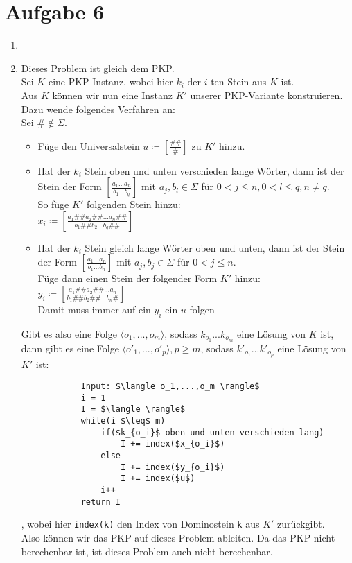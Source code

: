 \documentclass[a4paper,11pt]{scrartcl}
\begin{document}
\newpage
	\section*{Aufgabe 6}
	\begin{enumerate}[label=\alph*)]
	\item	
			
	\item	Dieses Problem ist gleich dem PKP.\\
			Sei $K$ eine PKP-Instanz, wobei hier $k_i$ der $i$-ten Stein aus $K$ ist.\\
			Aus $K$ können wir nun eine Instanz $K'$ unserer PKP-Variante konstruieren. Dazu wende folgendes Verfahren an:\\
			Sei $\# \not\in \Sigma$.
			\begin{itemize}
			\item Füge den Universalstein $u \coloneqq \left[ \frac{\#\#}{\#} \right]$ zu $K'$ hinzu.
			\item Hat der $k_i$ Stein oben und unten verschieden lange Wörter, dann ist der Stein der Form $\left[ \frac{a_1...a_n}{b_1...b_q} \right]$ mit $a_j, b_l \in \Sigma$ für $0<j\leq n, 0<l\leq q, n \neq q$.\\
			      So füge $K'$ folgenden Stein hinzu:\\
			      $x_i \coloneqq \left[ \frac{a_1\#\#a_2\#\#...a_n\#\#}{b_1\#\#b_2...b_q\#\#} \right]$
			\item Hat der $k_i$ Stein gleich lange Wörter oben und unten, dann ist der Stein der Form $\left[ \frac{a_1...a_n}{b_1...b_n} \right]$ mit $a_j, b_j \in \Sigma$ für $0<j\leq n$.\\
				  Füge dann einen Stein der folgender Form $K'$ hinzu:\\
				  $y_i \coloneqq \left[ \frac{a_1\#\#a_2\#\#...a_n}{b_1\#\#b_2\#\#...b_n\#} \right]$\\
				  Damit muss immer auf ein $y_i$ ein $u$ folgen
			\end{itemize}
			Gibt es also eine Folge $\langle o_1,...,o_m \rangle$, sodass $k_{o_1} ... k_{o_m}$ eine Lösung von $K$ ist, dann gibt es eine Folge $\langle o'_1,...,o'_p \rangle , p \geq m$, sodass $k'_{o_1} ... k'_{o_p}$ eine Lösung von $K'$ ist:
			\begin{lstlisting}
			Input: $\langle o_1,...,o_m \rangle$
			i = 1
			I = $\langle \rangle$
			while(i $\leq$ m)
				if($k_{o_i}$ oben und unten verschieden lang)
					I += index($x_{o_i}$)
				else
					I += index($y_{o_i}$)
					I += index($u$)
				i++
			return I
			\end{lstlisting}
			, wobei hier \verb|index(k)| den Index von Dominostein \verb|k| aus $K'$ zurückgibt.\\
			Also können wir das PKP auf dieses Problem ableiten. Da das PKP nicht berechenbar ist, ist dieses Problem auch nicht berechenbar.
	\end{enumerate}
	
\end{document}
